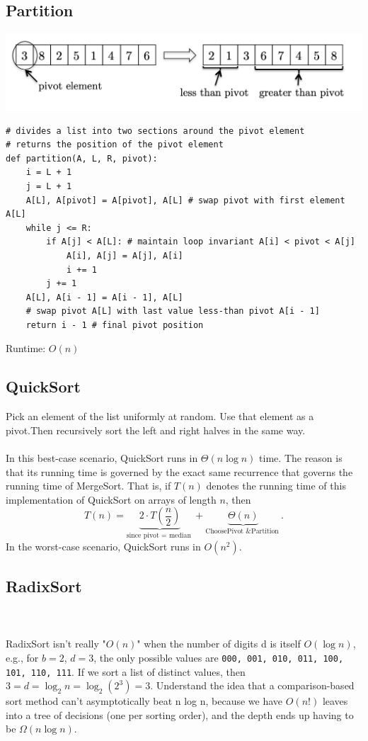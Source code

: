 \documentclass[12pt]{article}
\begin{document}
\subsection*{Partition}
\includegraphics[scale=0.3]{partition.png}
\begin{mdframed}
\begin{verbatim}
# divides a list into two sections around the pivot element
# returns the position of the pivot element
def partition(A, L, R, pivot):
    i = L + 1
    j = L + 1
    A[L], A[pivot] = A[pivot], A[L] # swap pivot with first element A[L]
    while j <= R:
        if A[j] < A[L]: # maintain loop invariant A[i] < pivot < A[j]
            A[i], A[j] = A[j], A[i]
            i += 1
        j += 1
    A[L], A[i - 1] = A[i - 1], A[L]  
    # swap pivot A[L] with last value less-than pivot A[i - 1]
    return i - 1 # final pivot position
\end{verbatim}
\end{mdframed}
Runtime: $O(n)$
\subsection*{QuickSort}
Pick an element of the list uniformly at random. Use that element as a pivot.Then recursively sort the left and right halves in the same way. \\\\
In this best-case scenario, QuickSort runs in $\Theta(n \log n)$ time. The reason is that its running time is governed by the exact same recurrence that governs the running time of MergeSort. That is, if $T(n)$ denotes the running time of this implementation of QuickSort on arrays of length $n$, then
$$
T(n)=\underbrace{2 \cdot T\left(\frac{n}{2}\right)}_{\text {since pivot }=\text { median }}+\underbrace{\Theta(n)}_{\text {ChoosePivot \& Partition }} .
$$
In the worst-case scenario, QuickSort runs in $O(n^2)$.
\subsection*{RadixSort}
\\\\
RadixSort isn't really "$O(n)$" when the number of
digits d is itself $O(\log n)$, e.g., for $b = 2$, $d = 3$, the only possible values are \texttt{000, 001, 010, 011, 100, 101, 110, 111}. If we sort a list of distinct values,
then $3 = d = \log_2n = \log_2(2^3) = 3$. Understand the idea that a comparison-based sort method can't asymptotically beat n log n, because we have $O(n!)$ leaves into a tree of decisions (one per sorting order), and the depth
ends up having to be $\Omega(n \log n)$.
\end{document}
